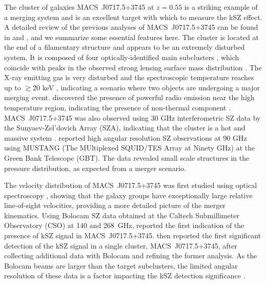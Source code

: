 \documentclass[twocolumn,traditabstract]{aa}
\begin{document}
The cluster of galaxies \mbox{MACS~J0717.5+3745} at $z=0.55$ is a striking example of a merging system and is an excellent target with which to measure the kSZ effect. A detailed review of the previous analyses of \mbox{MACS~J0717.5+3745} can be found in \cite{Mroczkowski2012} and \cite{Sayers2013}, and we summarize some essential features here. The cluster is located at the end of a filamentary structure \citep[e.g.,][]{Ebeling2004,Jauzac2012} and appears to be an extremely disturbed system. It is composed of four optically-identified main subclusters \citep{Ma2009}, which coincide with peaks in the observed strong lensing surface mass distribution \citep[see e.g.,][]{Zitrin2009,Diego2015,Limousin2015,Kawamata2016}. The X-ray emitting gas is very disturbed \citep[e.g.,][]{Ebeling2007,Ma2009} and the spectroscopic temperature reaches up to $\gtrsim 20$ keV \citep{Ma2009}, indicating a scenario where two objects are undergoing a major merging event. \cite{Edge2003} discovered the presence of powerful radio emission near the high temperature region, indicating the presence of non-thermal component \citep[see also, e.g.,][]{vanWeeren2009}. \mbox{MACS~J0717.5+3745} was also observed using 30 GHz interferometric SZ data by the Sunyaev-Zel'dovich Array (SZA), indicating that the cluster is a hot and massive system \citep{LaRoque2003}. \cite{Mroczkowski2012} reported high angular resolution SZ observations at 90 GHz using MUSTANG (The MUltiplexed SQUID/TES Array at Ninety GHz) at the Green Bank Telescope (GBT). The data revealed small scale structures in the pressure distribution, as expected from a merger scenario.

The velocity distribution of \mbox{MACS~J0717.5+3745} was first studied using optical spectroscopy \citep{Ma2009}, showing that the galaxy groups have exceptionally large relative line-of-sight velocities, providing a more detailed picture of the merger kinematics. Using Bolocam SZ data obtained at the Caltech Submillimeter Observatory (CSO) at 140 and 268~GHz, \cite{Mroczkowski2012} reported the first indication of the presence of kSZ signal in \mbox{MACS~J0717.5+3745}. \cite{Sayers2013} then reported the first significant detection of the kSZ signal in a single cluster, \mbox{MACS~J0717.5+3745}, after collecting additional data with Bolocam and refining the former analysis. As the Bolocam beams are larger than the target subclusters, the limited angular resolution of these data is a factor impacting the kSZ detection significance \citep[see][for more details]{Sayers2013}.
\end{document}
